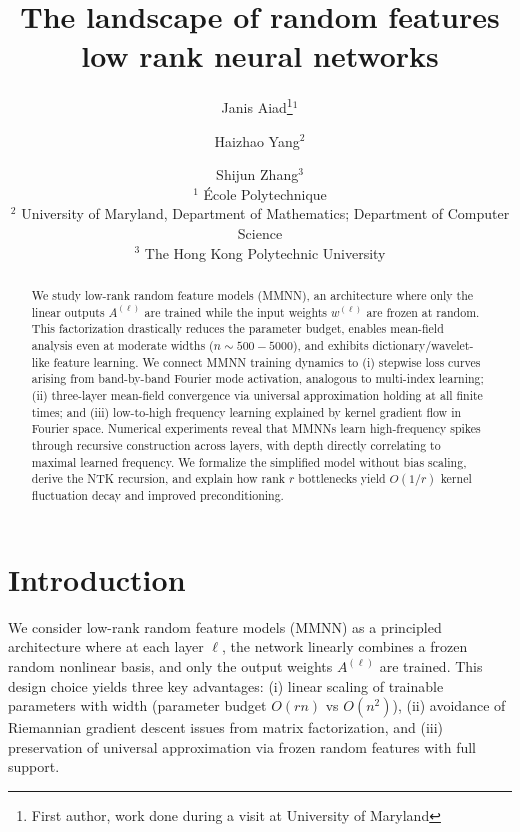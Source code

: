 \documentclass{article}
\title{The landscape of random features low rank neural networks}
\author{
  Janis Aiad\thanks{First author, work done during a visit at University of Maryland}$^{1}$ \and Haizhao Yang$^{2}$ \and Shijun Zhang$^{3}$ \\
  $^{1}$ École Polytechnique \\
  $^{2}$ University of Maryland, Department of Mathematics; Department of Computer Science \\
  $^{3}$ The Hong Kong Polytechnic University
}
\begin{document}
\maketitle

\begin{abstract}
We study low-rank random feature models (MMNN), an architecture where only the linear outputs \( A^{(\ell)} \) are trained while the input weights \( w^{(\ell)} \) are frozen at random. This factorization drastically reduces the parameter budget, enables mean-field analysis even at moderate widths (\( n \sim 500{-}5000 \)), and exhibits dictionary/wavelet-like feature learning. We connect MMNN training dynamics to (i) stepwise loss curves arising from band-by-band Fourier mode activation, analogous to multi-index learning; (ii) three-layer mean-field convergence via universal approximation holding at all finite times; and (iii) low-to-high frequency learning explained by kernel gradient flow in Fourier space. Numerical experiments reveal that MMNNs learn high-frequency spikes through recursive construction across layers, with depth directly correlating to maximal learned frequency. We formalize the simplified model without bias scaling, derive the NTK recursion, and explain how rank \( r \) bottlenecks yield \( O(1/r) \) kernel fluctuation decay and improved preconditioning.
\end{abstract}


\tableofcontents

\vspace{2em}
\section{Introduction}
We consider low-rank random feature models (MMNN) as a principled architecture where at each layer \( \ell \), the network linearly combines a frozen random nonlinear basis, and only the output weights \( A^{(\ell)} \) are trained. This design choice yields three key advantages: (i) linear scaling of trainable parameters with width (parameter budget \( O(rn) \) vs \( O(n^2) \)), (ii) avoidance of Riemannian gradient descent issues from matrix factorization, and (iii) preservation of universal approximation via frozen random features with full support.
\end{document}
